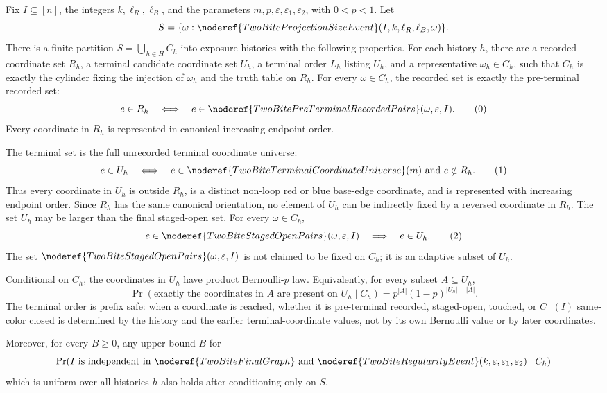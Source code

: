 \begin{helper}
Fix \(I\subseteq[n]\), the integers \(k,\ell_R,\ell_B\), and the parameters
\(m,p,\varepsilon,\varepsilon_1,\varepsilon_2\), with \(0<p<1\).  Let
\[
S=\{\omega:
\noderef{TwoBiteProjectionSizeEvent}(I,k,\ell_R,\ell_B,\omega)\}.
\]
There is a finite partition \(S=\dot\bigcup_{h\in H}C_h\) into exposure
histories with the following properties.  For each history \(h\), there are a
recorded coordinate set \(R_h\), a terminal candidate coordinate set \(U_h\),
a terminal order \(L_h\) listing \(U_h\), and a representative
\(\omega_h\in C_h\), such that \(C_h\) is exactly the cylinder fixing the
injection of \(\omega_h\) and the truth table on \(R_h\).  For every
\(\omega\in C_h\), the recorded set is exactly the pre-terminal recorded
set:
\[
e\in R_h
\quad\Longleftrightarrow\quad
e\in\noderef{TwoBitePreTerminalRecordedPairs}(\omega,\varepsilon,I).
\tag{0}
\]
Every coordinate in \(R_h\) is represented in canonical increasing endpoint
order.

The terminal set is the full unrecorded terminal coordinate universe:
\[
e\in U_h
\quad\Longleftrightarrow\quad
e\in\noderef{TwoBiteTerminalCoordinateUniverse}(m)
\hbox{ and }e\notin R_h.
\tag{1}
\]
Thus every coordinate in \(U_h\) is outside \(R_h\), is a distinct non-loop
red or blue base-edge coordinate, and is represented with increasing endpoint
order.  Since \(R_h\) has the same canonical orientation, no element of
\(U_h\) can be indirectly fixed by a reversed coordinate in \(R_h\).  The set
\(U_h\) may be larger than the final staged-open set.
For every \(\omega\in C_h\),
\[
e\in\noderef{TwoBiteStagedOpenPairs}(\omega,\varepsilon,I)
\quad\Longrightarrow\quad
e\in U_h.
\tag{2}
\]
The set \(\noderef{TwoBiteStagedOpenPairs}(\omega,\varepsilon,I)\) is not
claimed to be fixed on \(C_h\); it is an adaptive subset of \(U_h\).

Conditional on \(C_h\), the coordinates in \(U_h\) have product
Bernoulli-\(p\) law.  Equivalently, for every subset \(A\subseteq U_h\),
\[
\Pr(\text{exactly the coordinates in }A\text{ are present on }U_h\mid C_h)
=p^{|A|}(1-p)^{|U_h|-|A|}.
\tag{3}
\]
The terminal order is prefix safe: when a coordinate is reached, whether it is
pre-terminal recorded, staged-open, touched, or \(C^+(I)\) same-color closed
is determined by the history and the earlier terminal-coordinate values, not
by its own Bernoulli value or by later coordinates.

Moreover, for every \(B\ge0\), any upper bound \(B\) for
\[
\Pr(I\text{ is independent in }\noderef{TwoBiteFinalGraph}
       \text{ and }
       \noderef{TwoBiteRegularityEvent}
       (k,\varepsilon,\varepsilon_1,\varepsilon_2)
       \mid C_h)
\]
which is uniform over all histories \(h\) also holds after conditioning only
on \(S\).
\end{helper}
